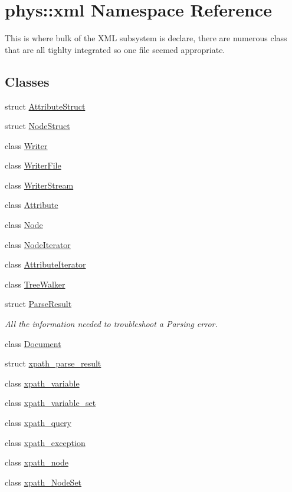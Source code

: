 \hypertarget{namespacephys_1_1xml}{
\section{phys::xml Namespace Reference}
\label{d9/d27/namespacephys_1_1xml}
}


This is where bulk of the XML subsystem is declare, there are numerous class that are all tighlty integrated so one file seemed appropriate.  


\subsection*{Classes}
\begin{DoxyCompactItemize}
\item 
struct \hyperlink{structphys_1_1xml_1_1AttributeStruct}{AttributeStruct}
\item 
struct \hyperlink{structphys_1_1xml_1_1NodeStruct}{NodeStruct}
\item 
class \hyperlink{classphys_1_1xml_1_1Writer}{Writer}
\item 
class \hyperlink{classphys_1_1xml_1_1WriterFile}{WriterFile}
\item 
class \hyperlink{classphys_1_1xml_1_1WriterStream}{WriterStream}
\item 
class \hyperlink{classphys_1_1xml_1_1Attribute}{Attribute}
\item 
class \hyperlink{classphys_1_1xml_1_1Node}{Node}
\item 
class \hyperlink{classphys_1_1xml_1_1NodeIterator}{NodeIterator}
\item 
class \hyperlink{classphys_1_1xml_1_1AttributeIterator}{AttributeIterator}
\item 
class \hyperlink{classphys_1_1xml_1_1TreeWalker}{TreeWalker}
\item 
struct \hyperlink{structphys_1_1xml_1_1ParseResult}{ParseResult}
\begin{DoxyCompactList}\small\item\em All the information needed to troubleshoot a Parsing error. \item\end{DoxyCompactList}\item 
class \hyperlink{classphys_1_1xml_1_1Document}{Document}
\item 
struct \hyperlink{structphys_1_1xml_1_1xpath__parse__result}{xpath\_\-parse\_\-result}
\item 
class \hyperlink{classphys_1_1xml_1_1xpath__variable}{xpath\_\-variable}
\item 
class \hyperlink{classphys_1_1xml_1_1xpath__variable__set}{xpath\_\-variable\_\-set}
\item 
class \hyperlink{classphys_1_1xml_1_1xpath__query}{xpath\_\-query}
\item 
class \hyperlink{classphys_1_1xml_1_1xpath__exception}{xpath\_\-exception}
\item 
class \hyperlink{classphys_1_1xml_1_1xpath__node}{xpath\_\-node}
\item 
class \hyperlink{classphys_1_1xml_1_1xpath__NodeSet}{xpath\_\-NodeSet}
\end{DoxyCompactItemize}
